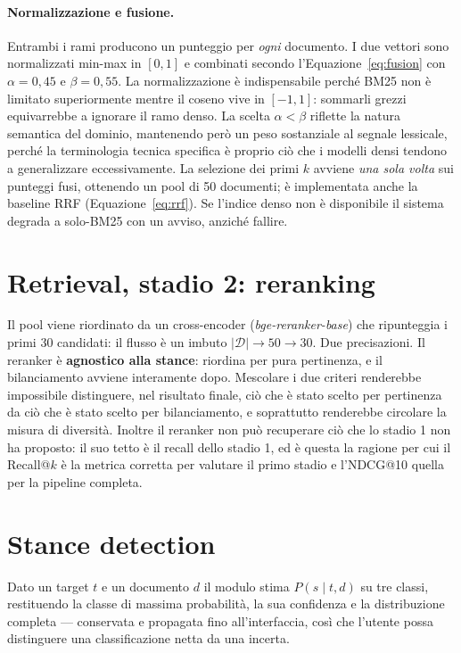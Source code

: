 \documentclass[11pt,a4paper]{report}
\begin{document}
\paragraph{Normalizzazione e fusione.} Entrambi i rami producono un punteggio per \emph{ogni}
documento. I due vettori sono normalizzati min-max in $[0,1]$ e combinati secondo
l'Equazione~\ref{eq:fusion} con $\alpha = 0{,}45$ e $\beta = 0{,}55$. La normalizzazione è
indispensabile perché BM25 non è limitato superiormente mentre il coseno vive in $[-1,1]$:
sommarli grezzi equivarrebbe a ignorare il ramo denso. La scelta $\alpha < \beta$ riflette la
natura semantica del dominio, mantenendo però un peso sostanziale al segnale lessicale, perché la
terminologia tecnica specifica è proprio ciò che i modelli densi tendono a generalizzare
eccessivamente. La selezione dei primi $k$ avviene \emph{una sola volta} sui punteggi fusi,
ottenendo un pool di 50 documenti; è implementata anche la baseline RRF
(Equazione~\ref{eq:rrf}). Se l'indice denso non è disponibile il sistema degrada a solo-BM25 con
un avviso, anziché fallire.

\section{Retrieval, stadio 2: reranking}
Il pool viene riordinato da un cross-encoder (\emph{bge-reranker-base}) che ripunteggia i primi
30 candidati: il flusso è un imbuto $|\mathcal{D}| \to 50 \to 30$. Due precisazioni. Il reranker
è \textbf{agnostico alla stance}: riordina per pura pertinenza, e il bilanciamento avviene
interamente dopo. Mescolare i due criteri renderebbe impossibile distinguere, nel risultato
finale, ciò che è stato scelto per pertinenza da ciò che è stato scelto per bilanciamento, e
soprattutto renderebbe circolare la misura di diversità. Inoltre il reranker non può recuperare
ciò che lo stadio 1 non ha proposto: il suo tetto è il recall dello stadio 1, ed è questa la
ragione per cui il Recall@$k$ è la metrica corretta per valutare il primo stadio e l'NDCG@10
quella per la pipeline completa.

\section{Stance detection}\label{sec:metodo-stance}
Dato un target $t$ e un documento $d$ il modulo stima $P(s \mid t, d)$ su tre classi,
restituendo la classe di massima probabilità, la sua confidenza e la distribuzione completa ---
conservata e propagata fino all'interfaccia, così che l'utente possa distinguere una
classificazione netta da una incerta.
\end{document}
